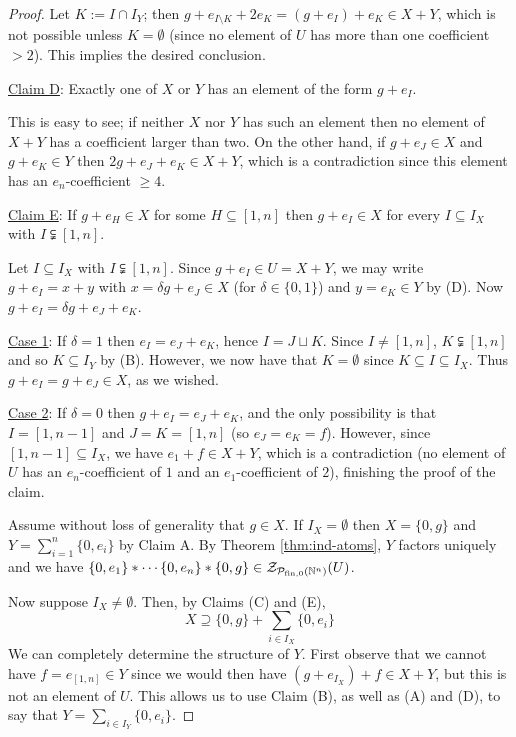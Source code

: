 \begin{proof}
	Let $K := I\cap I_Y$; then $g + e_{I\setminus K} + 2e_K = (g+e_I) + e_K \in X+Y$, which is not possible unless $K=\emptyset$ (since no element of $U$ has more than one coefficient $>2$).
	This implies the desired conclusion.
	
	\noindent\underline{Claim D}: Exactly one of $X$ or $Y$ has an element of the form $g + e_I$. 
	
	This is easy to see; if neither $X$ nor $Y$ has such an element then no element of $X+Y$ has a coefficient larger than two.
	On the other hand, if $g+e_J\in X$ and $g+e_K\in Y$ then $2g + e_J + e_K \in X+Y$, which is a contradiction since this element has an $e_n$-coefficient $\ge 4$.
	
	\noindent\underline{Claim E}: If $g+ e_H\in X$ for some $H\subseteq [ 1,n ]$ then $g + e_I \in X$ for every $I\subseteq I_X$ with $I\subsetneqq [ 1,n]$. 
	
	Let $I \subseteq I_X$ with $I\subsetneqq [1,n]$.
	Since $g+e_I\in U = X+Y$, we may write $g+e_I = x +y$ with $x = \delta g + e_J\in X$ (for $\delta\in \{0,1\}$) and $y=e_K\in Y$ by (D).
	Now $g + e_I = \delta g + e_J + e_K$.
	
	\underline{Case 1}: If $\delta = 1$ then $e_I = e_J + e_K$, hence $I = J\sqcup K$. 
		Since $I\neq [1,n]$, $K\subsetneqq [ 1,n ]$ and so $K\subseteq I_Y$ by (B).
		However, we now have that $K = \emptyset$ since $K\subseteq I \subseteq I_X$.
		Thus $g + e_I = g + e_J \in X$, as we wished.
	
	\underline{Case 2}: If $\delta = 0$ then $g + e_I = e_J + e_K$, and the only possibility is that $I = [ 1,n-1]$ and $J = K = [ 1,n]$ (so $e_J = e_K = f$).
		However, since $[ 1,n-1 ] \subseteq I_X$, we have $e_1 + f \in X+Y$, which is a contradiction (no element of $U$ has an $e_n$-coefficient of $1$ and an $e_1$-coefficient of $2$), finishing the proof of the claim.
	
	Assume without loss of generality that $g\in X$.
	If $I_X = \emptyset$ then $X = \{0,g\}$ and $Y = \sum_{i=1}^n \{0,e_i\}$ by Claim A.
	By Theorem \ref{thm:ind-atoms}, $Y$ factors uniquely and we have $\{0,e_1\}*\cdots \{0,e_n\}*\{0,g\}\in \mathcal{Z}_{\mathcal{P}_{\textrm{fin}, 0}(\mathbb{N}^n)}(U)$.
	
	Now suppose $I_X \neq \emptyset$.
	Then, by Claims (C) and (E), 
	\[X \supseteq \{0,g\} + \sum_{i\in I_X} \{0,e_i\} \tag{1} \label{factor-includes} \]
	We can completely determine the structure of $Y$.
	First observe that we cannot have $f=e_{[1,n]}\in Y$ since we would then have $(g+e_{I_X})+f \in X+Y$, but this is not an element of $U$.
	This allows us to use Claim (B), as well as (A) and (D), to say that $Y = \sum_{i\in I_Y} \{0,e_i\}$.
	

\end{proof}
